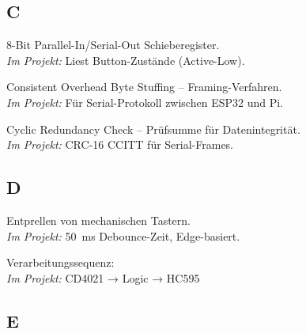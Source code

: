 \subsection*{C}

\begin{description}[style=nextline, leftmargin=2.5cm, labelwidth=2.3cm]

\item[CD4021]
8-Bit Parallel-In/Serial-Out Schieberegister.\\
\textit{Im Projekt:} Liest Button-Zustände (Active-Low).

\item[COBS]
Consistent Overhead Byte Stuffing – Framing-Verfahren.\\
\textit{Im Projekt:} Für Serial-Protokoll zwischen ESP32 und Pi.

\item[CRC]
Cyclic Redundancy Check – Prüfsumme für Datenintegrität.\\
\textit{Im Projekt:} CRC-16 CCITT für Serial-Frames.

\end{description}

\subsection*{D}

\begin{description}[style=nextline, leftmargin=2.5cm, labelwidth=2.3cm]

\item[Debounce]
Entprellen von mechanischen Tastern.\\
\textit{Im Projekt:} \SI{50}{\milli\second} Debounce-Zeit, Edge-basiert.

\item[Datenfluss]
Verarbeitungssequenz: \\
\textit{Im Projekt:} CD4021 → Logic → HC595

\end{description}

\subsection*{E}

